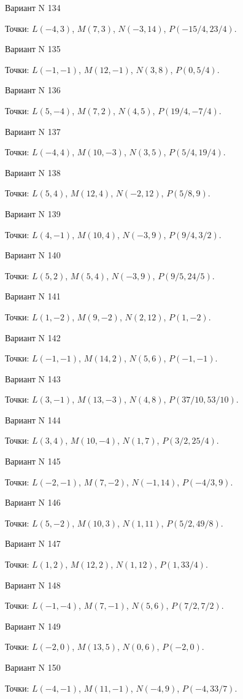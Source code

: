 \documentclass[11pt]{report}
\begin{document}
Вариант N 134

Точки: $L(-4, 3)$, $M(7, 3)$, $N(-3, 14)$, $P(-15/4, 23/4)$.

Вариант N 135

Точки: $L(-1, -1)$, $M(12, -1)$, $N(3, 8)$, $P(0, 5/4)$.

Вариант N 136

Точки: $L(5, -4)$, $M(7, 2)$, $N(4, 5)$, $P(19/4, -7/4)$.

Вариант N 137

Точки: $L(-4, 4)$, $M(10, -3)$, $N(3, 5)$, $P(5/4, 19/4)$.

Вариант N 138

Точки: $L(5, 4)$, $M(12, 4)$, $N(-2, 12)$, $P(5/8, 9)$.

Вариант N 139

Точки: $L(4, -1)$, $M(10, 4)$, $N(-3, 9)$, $P(9/4, 3/2)$.

Вариант N 140

Точки: $L(5, 2)$, $M(5, 4)$, $N(-3, 9)$, $P(9/5, 24/5)$.

Вариант N 141

Точки: $L(1, -2)$, $M(9, -2)$, $N(2, 12)$, $P(1, -2)$.

Вариант N 142

Точки: $L(-1, -1)$, $M(14, 2)$, $N(5, 6)$, $P(-1, -1)$.

Вариант N 143

Точки: $L(3, -1)$, $M(13, -3)$, $N(4, 8)$, $P(37/10, 53/10)$.

Вариант N 144

Точки: $L(3, 4)$, $M(10, -4)$, $N(1, 7)$, $P(3/2, 25/4)$.

Вариант N 145

Точки: $L(-2, -1)$, $M(7, -2)$, $N(-1, 14)$, $P(-4/3, 9)$.

Вариант N 146

Точки: $L(5, -2)$, $M(10, 3)$, $N(1, 11)$, $P(5/2, 49/8)$.

Вариант N 147

Точки: $L(1, 2)$, $M(12, 2)$, $N(1, 12)$, $P(1, 33/4)$.

Вариант N 148

Точки: $L(-1, -4)$, $M(7, -1)$, $N(5, 6)$, $P(7/2, 7/2)$.

Вариант N 149

Точки: $L(-2, 0)$, $M(13, 5)$, $N(0, 6)$, $P(-2, 0)$.

Вариант N 150

Точки: $L(-4, -1)$, $M(11, -1)$, $N(-4, 9)$, $P(-4, 33/7)$.
\end{document}
